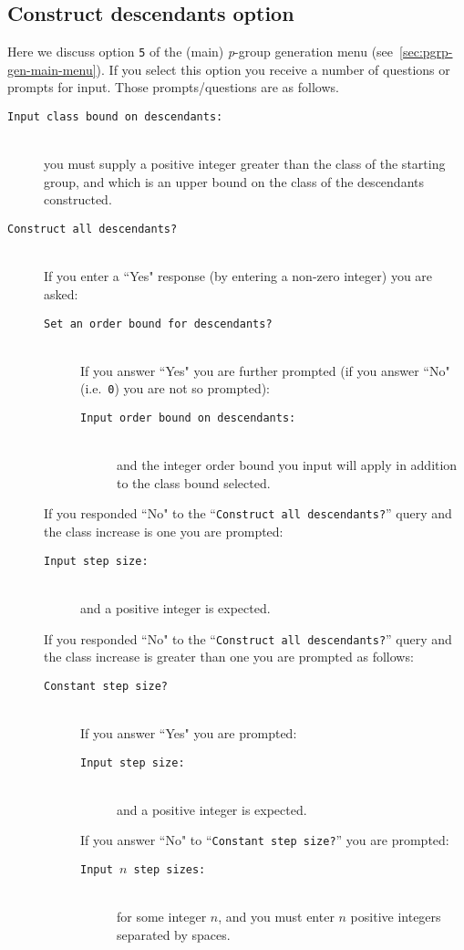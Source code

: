 \documentclass[12pt]{article}
\begin{document}
\subsection{Construct descendants option}\label{sec:constr-desc}
Here we discuss option \texttt{5} of the (main) {\it p}-group generation
menu (see~\ref{sec:pgrp-gen-main-menu}).
If you select this option you receive a number of questions or prompts
for input. Those prompts/questions are as follows.
\begin{description}
\item[\texttt{Input class bound on descendants:}]\ \\
 you must supply a positive integer greater than the class 
 of the starting group, and which is an upper bound
 on the class of the descendants constructed. 

\item[\texttt{Construct all descendants?}]\ \\
 If you enter a ``Yes" response (by entering a non-zero integer)
 you are asked:
 \begin{description}
  \item[\texttt{Set an order bound for descendants?}]\ \\
  If you answer ``Yes" you are further prompted (if you answer
  ``No" (i.e.\ \texttt{0}) you are not so prompted):
  \begin{description}
   \item[\texttt{Input order bound on descendants:}]\ \\
   and the integer order bound you input will apply in addition to 
   the class bound selected.
  \end{description}
 \end{description}
 If you responded ``No" to the ``\texttt{Construct all descendants?}'' query
 and the class increase is one you are prompted:
 \begin{description}
  \item[\texttt{Input step size:}]\ \\
  and a positive integer is expected.
 \end{description}
 If you responded ``No" to the ``\texttt{Construct all descendants?}'' query
 and the class increase is greater than one you are prompted as follows:
 \begin{description}
  \item[\texttt{Constant step size?}]\ \\
  If you answer ``Yes" you are prompted:
  \begin{description}
   \item[\texttt{Input step size:}]\ \\
   and a positive integer is expected.
  \end{description}
  If you answer ``No" to ``\texttt{Constant step size?}'' you are prompted:
  \begin{description}
   \item[\texttt{Input $n$ step sizes:}]\ \\
   for some integer $n$, and you must enter $n$ positive
   integers separated by spaces.
  \end{description}
 \end{description}


\end{description}
\end{document}
